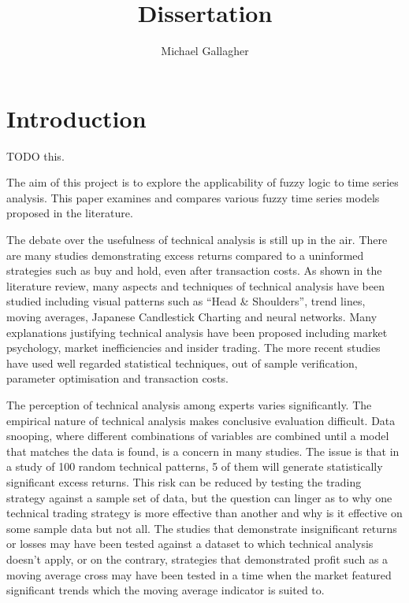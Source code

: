 \documentclass{article}
\title{Dissertation}
\author{Michael Gallagher}
\theoremstyle{definition}
\begin{document}
\maketitle



\tableofcontents

\section{Introduction}
TODO this.

The aim of this project is to explore the applicability of fuzzy logic to time series analysis. This paper examines and compares various fuzzy time series models proposed in the literature.

The debate over the usefulness of technical analysis is still up in the air. There are many studies demonstrating excess returns compared to a uninformed strategies such as buy and hold, even after transaction costs. As shown in the literature review, many aspects and techniques of technical analysis have been studied including visual patterns such as ``Head \& Shoulders'', trend lines, moving averages, Japanese Candlestick Charting and neural networks. Many explanations justifying technical analysis have been proposed including market psychology, market inefficiencies and insider trading. The more recent studies have used well regarded statistical techniques, out of sample verification, parameter optimisation and transaction costs.

The perception of technical analysis among experts varies significantly. The empirical nature of technical analysis makes conclusive evaluation difficult. Data snooping, where different combinations of variables are combined until a model that matches the data is found, is a concern in many studies. The issue is that in a study of 100 random technical patterns, 5 of them will generate statistically significant excess returns. This risk can be reduced by testing the trading strategy against a sample set of data, but the question can linger as to why one technical trading strategy is more effective than another and why is it effective on some sample data but not all. The studies that demonstrate insignificant returns or losses may have been tested against a dataset to which technical analysis doesn't apply, or on the contrary, strategies that demonstrated profit such as a moving average cross may have been tested in a time when the market featured significant trends which the moving average indicator is suited to.
\end{document}
